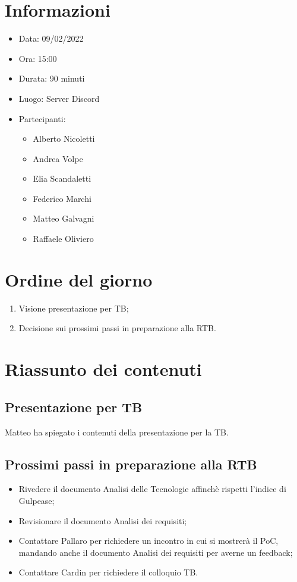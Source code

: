 \documentclass[a4paper, 12pt]{article}
\begin{document}
\makefrontpage

\section{Informazioni}

\begin{itemize}
\item Data: 09/02/2022
\item Ora: 15:00
\item Durata: 90 minuti
\item Luogo: Server Discord
\item Partecipanti:
\begin{itemize}
\item Alberto Nicoletti
\item Andrea Volpe
\item Elia Scandaletti
\item Federico Marchi
\item Matteo Galvagni
\item Raffaele Oliviero
\end{itemize}
\end{itemize}

\section{Ordine del giorno}
\begin{enumerate}
	\item Visione presentazione per TB;
    \item Decisione sui prossimi passi in preparazione alla RTB.
\end{enumerate}

\section{Riassunto dei contenuti}

\subsection{Presentazione per TB}
	Matteo ha spiegato i contenuti della presentazione per la TB.
\subsection{Prossimi passi in preparazione alla RTB}
\begin{itemize}
	\item Rivedere il documento Analisi delle Tecnologie affinchè rispetti l'indice di Gulpease;
	\item Revisionare il documento Analisi dei requisiti;
	\item Contattare Pallaro per richiedere un incontro in cui si mostrerà il PoC, mandando anche il documento Analisi dei requisiti per averne un feedback;
    \item Contattare Cardin per richiedere il colloquio TB.
\end{itemize}
\end{document}
